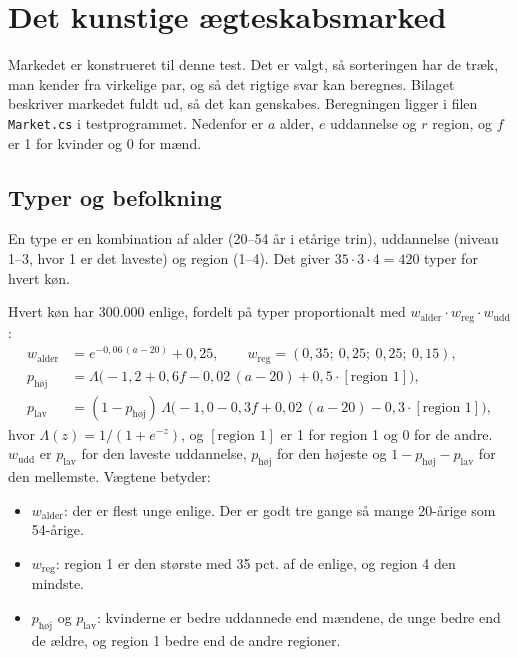 \documentclass[11pt,a4paper]{article}
\newcommand{\kode}[1]{\texttt{#1}}
\begin{document}
\appendix
\section{Det kunstige ægteskabsmarked}\label{app:parametre}

Markedet er konstrueret til denne test. Det er valgt, så sorteringen har de træk, man kender fra
virkelige par, og så det rigtige svar kan beregnes. Bilaget beskriver markedet fuldt ud, så det kan
genskabes. Beregningen ligger i filen \kode{Market.cs} i testprogrammet. Nedenfor er $a$ alder, $e$
uddannelse og $r$ region, og $f$ er 1 for kvinder og 0 for mænd.

\subsection{Typer og befolkning}

En type er en kombination af alder (20--54 år i etårige trin), uddannelse (niveau 1--3, hvor 1 er det
laveste) og region (1--4). Det giver $35\cdot3\cdot4=420$ typer for hvert køn.

Hvert køn har 300.000 enlige, fordelt på typer proportionalt med
$w_{\text{alder}}\cdot w_{\text{reg}}\cdot w_{\text{udd}}$:
\begin{align*}
w_{\text{alder}} &= e^{-0{,}06\,(a-20)}+0{,}25, \qquad w_{\text{reg}} = (0{,}35;\ 0{,}25;\ 0{,}25;\ 0{,}15),\\
p_{\text{høj}} &= \Lambda\bigl(-1{,}2+0{,}6f-0{,}02\,(a-20)+0{,}5\cdot[\text{region 1}]\bigr),\\
p_{\text{lav}} &= (1-p_{\text{høj}})\,\Lambda\bigl(-1{,}0-0{,}3f+0{,}02\,(a-20)-0{,}3\cdot[\text{region 1}]\bigr),
\end{align*}
hvor $\Lambda(z)=1/(1+e^{-z})$, og $[\text{region 1}]$ er 1 for region 1 og 0 for de andre.
$w_{\text{udd}}$ er $p_{\text{lav}}$ for den laveste uddannelse, $p_{\text{høj}}$ for den højeste og
$1-p_{\text{høj}}-p_{\text{lav}}$ for den mellemste. Vægtene betyder:

\begin{itemize}
\item $w_{\text{alder}}$: der er flest unge enlige. Der er godt tre gange så mange 20-årige som
54-årige.
\item $w_{\text{reg}}$: region 1 er den største med 35 pct. af de enlige, og region 4 den mindste.
\item $p_{\text{høj}}$ og $p_{\text{lav}}$: kvinderne er bedre uddannede end mændene, de unge bedre
end de ældre, og region 1 bedre end de andre regioner.
\end{itemize}
\end{document}
